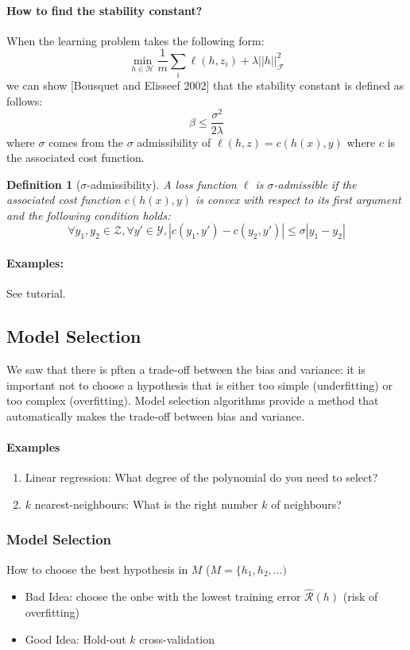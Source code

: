 \documentclass{article}
\newtheorem{defi}{Definition}
\begin{document}


\paragraph{How to find the stability constant?}
When the learning problem takes the following form:
\[\min_{h\in \mathcal{H}} \frac{1}{m} \sum_{i} \ell (h,z_i) + \lambda||h||^2_{\mathcal{F}}\]
we can show [Bousquet and Elisseef 2002] that the stability constant is defined as follows:
\[\beta \leq \frac{\sigma^2}{2\lambda}\]
where $\sigma$ comes from the $\sigma$ admissibility of $\ell(h,z)=c(h(x),y)$ where $c$ is the associated cost function.

\begin{defi}[$\sigma$-admissibility]
A loss function $\ell$ is $\sigma$-admissible if the associated cost function $c(h(x),y)$ is convex with respect to its first argument and the following condition holds:
\[\forall y_1,y_2 \in \mathcal{Z}, \forall y' \in \mathcal{Y}, |c(y_1,y')-c(y_2,y')|\leq \sigma |y_1-y_2|\]
\end{defi}
\paragraph{Examples: }
See tutorial.

\subsection{Model Selection}
We saw that there is pften a trade-off between the bias and variance:  it is important not to choose a hypothesis that is either too simple (underfitting) or too complex (overfitting). Model selection algorithms provide a method that automatically makes the trade-off between bias and variance.

\paragraph{Examples}
\begin{enumerate}
\item Linear regression: What degree of the polynomial do you need to select?
\item $k$ nearest-neighbours: What is the right number $k$ of neighbours?
\end{enumerate}


\subsubsection*{Model Selection}
How to choose the best hypothesis in $M$ ($M=\{h_1,h_2,...)$
\begin{itemize}
 \item Bad Idea: choose the onbe with the lowest training error $\hat{\mathcal{R}}(h)$ (risk of overfitting)
 \item Good Idea: Hold-out $k$ cross-validation 
 \end{itemize} 
\end{document}
